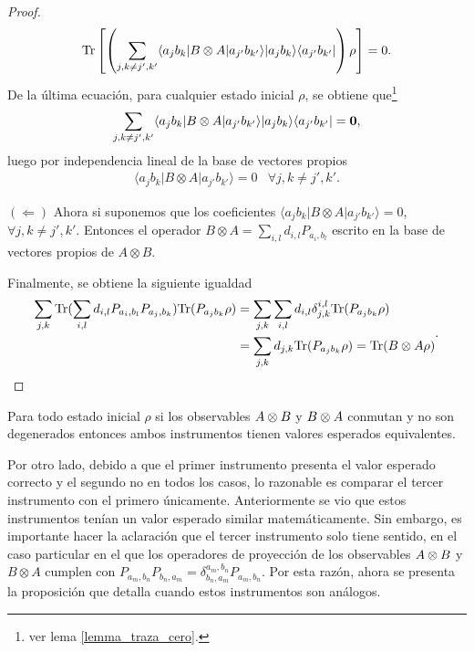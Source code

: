 \begin{proof}
\[\begin{split}
    {\rm Tr}\left[\left(\sum_{j,k\ne j',k'}  \langle a_j b_k |B\otimes A|a_{j'}b_{k'}\rangle |a_j b_k\rangle \langle a_{j'}b_{k'}|\right)\rho\right]&=0.\\
    \end{split}\]
    De la última ecuación, para cualquier estado inicial $\rho$, se obtiene que\footnote[1]{ver lema {\ref{lemma_traza_cero}}.} 
    \[\sum_{j,k\ne j', k'} \langle a_j b_k |B\otimes A|a_{j'}b_{k'}\rangle |a_j b_k\rangle \langle a_{j'}b_{k'}|=\mathbf{0},\] luego por independencia lineal de la base de vectores propios  
     \[\begin{array}{cc}
        \langle a_j b_k |B\otimes A|a_{j'}b_{k'}\rangle=0& \forall j,k\ne j',k'.\end{array}\]

        $(\Leftarrow)$
        Ahora si suponemos que los coeficientes  $\langle a_j b_k |B\otimes A|a_{j'}b_{k'}\rangle=0$,  $\forall j,k\ne j',k'$. Entonces el operador $B\otimes A=\sum_{i,l}d_{i,l}P_{a_i, b_l}$ escrito en la base de vectores propios de $A\otimes B$.
        
        Finalmente, se obtiene la siguiente igualdad \[\begin{split}\sum_{j,k}{\rm Tr}( \sum_{i,l}d_{i,l}P_{a_i, b_l} P_{a_j,b_k}){\rm Tr}(P_{a_j b_k}\rho )&=\sum_{j,k}\sum_{i,l}d_{i,l}\delta_{j,k}^{i,l}{\rm Tr}(P_{a_j b_k}\rho )\\&=\sum_{j,k}d_{j,k}{\rm Tr}(P_{a_j b_k}\rho )={\rm Tr}(B\otimes A\rho)\end{split}.\]


\end{proof}

\begin{corollary}
   Para todo estado inicial $\rho$ si los observables $A\otimes B$ y $B\otimes A$ conmutan y  no son degenerados entonces ambos instrumentos tienen valores esperados equivalentes.
\end{corollary}






Por otro lado, debido a que el primer instrumento presenta el valor esperado correcto y el segundo no en todos los casos, lo razonable es comparar el tercer instrumento con el primero únicamente. Anteriormente se vio que estos instrumentos tenían un valor esperado similar matemáticamente. Sin embargo, es importante hacer la aclaración que el tercer instrumento solo tiene sentido, en el caso particular en el que los operadores de proyección de los observables $A\otimes B$ y $B\otimes A$ cumplen con $P_{a_m,b_n}P_{b_n,a_m}=\delta_{b_n,a_m}^{a_m,b_n}P_{a_m,b_n}$. Por esta razón, ahora se presenta la proposición que detalla cuando estos instrumentos son análogos.




